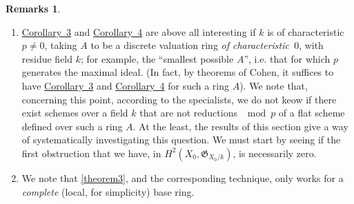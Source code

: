 \documentclass{article}
\theoremstyle{plain}
\theoremstyle{definition}
\newtheorem*{remarks}{Remarks}
\newcommand{\fk}{\mathfrak}
\newcommand{\oldpage}[1]{\marginpar{\footnotesize$\Big\vert$ \textit{p.~#1}}}
\begin{document}
\begin{remarks}
  \begin{enumerate}[1)]
    \item \hyperref[theorem9corollary3]{Corollary~3} and \hyperref[theorem9corollary4]{Corollary~4} are above all interesting if $k$ is of characteristic~$p\neq0$, taking $A$ to be a discrete valuation ring \emph{of characteristic~$0$}, with residue field $k$;
      for example, the ``smallest possible $A$'', i.e. that for which $p$ generates the maximal ideal.
      (In fact, by theorems of Cohen, it suffices to have \hyperref[theorem9corollary3]{Corollary~3} and \hyperref[theorem9corollary4]{Corollary~4} for such a ring $A$).
      We note that, concerning this point, according to the specialists, we do not keow if there exist schemes over a field $k$ that are not reductions $\mod p$ of a flat scheme defined over such a ring $A$.
      At the least, the results of this section give a way of systematically investigating this question.
      We must start
\oldpage{182-15}
      by seeing if the first obstruction that we have, in $H^2(X_0,\fk{G}_{X_0/k})$, is necessarily zero.
    \item We note that \cref{theorem3}, and the corresponding technique, only works for a \emph{complete} (local, for simplicity) base ring.


\end{enumerate}
\end{remarks}
\end{document}

